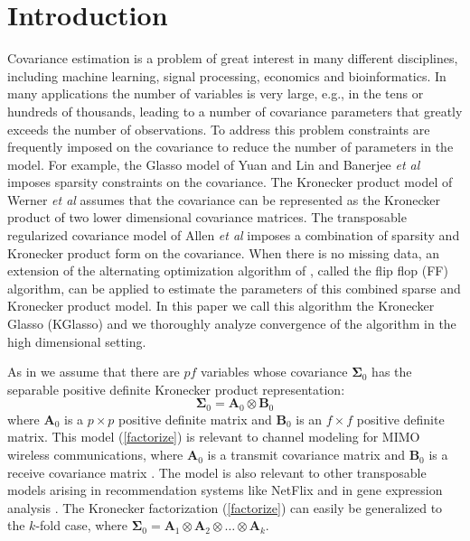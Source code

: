 \documentclass[journal,11pt,draftcls,onecolumn]{IEEEtran}
\def\bA{ {\mathbf{A}} }
\def\bB{ {\mathbf{B}} }
\begin{document}
\section{Introduction}
Covariance estimation is a problem of great interest in many different disciplines, including machine learning, signal processing, economics and bioinformatics. In many applications the number of variables is very large, e.g., in the tens or hundreds of thousands, leading to a number of covariance parameters that greatly exceeds the number of observations.  To address this problem constraints are frequently imposed on the covariance to reduce the number of parameters in the model. For example, the Glasso model of  Yuan and Lin \cite{YL07} and Banerjee {\it et al} \cite{ModelSel}  imposes sparsity constraints on the covariance. The Kronecker product  model of Werner {\it et al} \cite{EstCovMatKron} assumes that the covariance can be represented as the Kronecker product  of two lower dimensional covariance matrices. The 
transposable regularized covariance model of Allen {\it et al}  \cite{AllenTib10} imposes a combination of sparsity and Kronecker product form on the covariance. When there is no missing data, an extension of the alternating optimization algorithm of  \cite{EstCovMatKron}, called the flip flop (FF) algorithm, can be applied to estimate the parameters of this combined sparse and Kronecker product model.  In this paper we call this algorithm the Kronecker Glasso (KGlasso) and  we thoroughly analyze convergence of the algorithm in the high dimensional setting.  


As in \cite{EstCovMatKron} we assume that there are $pf$ variables whose covariance $\mathbf{\Sigma}_0$ has the separable positive definite Kronecker product representation:
\begin{equation} \label{factorize}
	\mathbf{\Sigma}_{0} = \mathbf{A}_0 \otimes \mathbf{B}_0
\end{equation}
where $\bA_0$ is a $p\times p$ positive definite matrix and $\bB_0$ is an $f \times f$ positive definite matrix.  This model (\ref{factorize}) is relevant to channel modeling for MIMO wireless communications, where $\bA_0$ is a transmit covariance matrix and $\bB_0$ is a receive covariance matrix \cite{MIMOWerner}. The model is also relevant to other transposable models arising in recommendation systems like NetFlix and in gene expression analysis \cite{AllenTib10}. 
The Kronecker factorization (\ref{factorize}) can easily be generalized to the $k$-fold case, where $\mathbf{\Sigma}_0=\mathbf{A}_1\otimes \mathbf{A}_2 \otimes \dots \otimes \mathbf{A}_k$. 
\end{document}
